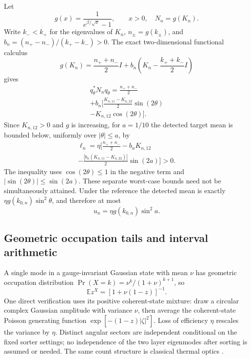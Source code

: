 \documentclass[aps,pra,reprint,superscriptaddress,longbibliography]{revtex4-2}
\begin{document}
Let
\[
 g(x)=\frac1{e^{\beta/\sqrt x}-1},\qquad x>0,
 \quad N_n=g(K_n).
\]
Write $k_-<k_+$ for the eigenvalues of $K_n$,
$n_\pm=g(k_\pm)$, and $b_n=(n_+-n_-)/(k_+-k_-)>0$.
The exact two-dimensional functional calculus
\[
 g(K_n)=\frac{n_++n_-}{2}I+
 b_n\left(K_n-\frac{k_++k_-}{2}I\right)
\]
gives
\begin{equation}
\begin{gathered}
 q_\theta^*N_nq_\theta=
 \frac{n_++n_-}{2}
\\
 +b_n\bigl[\frac{K_{n,11}-K_{n,22}}2\sin(2\theta)
\\
                         -K_{n,12}\cos(2\theta)\bigr].
 \label{sgt:finite:exact-sorted-covariance}
\end{gathered}
\end{equation}
Since $K_{n,12}>0$ and $g$ is increasing, for $a=1/10$ the
detected target mean is bounded below, uniformly over $|\theta|\le a$,
by
\begin{equation}
\begin{gathered}
 \ell_n=\eta\bigl[\frac{n_++n_-}{2}-b_nK_{n,12}
\\
 -\frac{|b_n(K_{n,11}-K_{n,22})|}{2}\sin(2a)\bigr]>0.
 \label{sgt:finite:signal-lower}
\end{gathered}
\end{equation}
The inequality uses $\cos(2\theta)\le1$ in the negative term and
$|\sin(2\theta)|\le\sin(2a)$. These separate worst-case bounds need
not be simultaneously attained. Under the reference the detected
mean is exactly $\eta g(k_{0,n})\sin^2\theta$, and therefore at most
\begin{equation}
 u_n=\eta g(k_{0,n})\sin^2a.
 \label{sgt:finite:null-upper}
\end{equation}

\subsection{Geometric occupation tails and interval arithmetic}
\label{sgt:finite:tails}

A single mode in a gauge-invariant Gaussian state with mean $\nu$ has
geometric occupation distribution
$\Pr(X=k)=\nu^k/(1+\nu)^{k+1}$, so
\[
 \mathbb Ez^X=[1+\nu(1-z)]^{-1}.
\]
One direct verification uses its positive coherent-state mixture:
draw a circular complex Gaussian amplitude with variance $\nu$,
then average the coherent-state Poisson generating function
$\exp[-(1-z)|\zeta|^2]$. Loss of efficiency $\eta$ rescales the
variance by $\eta$. Distinct angular sectors are independent
conditional on the fixed sorter settings; no independence of the
two layer eigenmodes after sorting is assumed or needed. The same
count structure is classical thermal optics \cite{Lu2018,Klich2002}.
\end{document}
